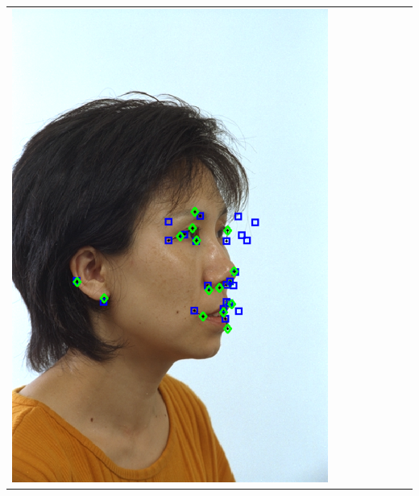 \documentclass[landscape,final,a0paper,fontscale=0.27065]{baposter}
\begin{document}
\begin{poster}
{{\begin{tabular}{@{}rccccccc@{}}
 \parbox[c]{0.11\linewidth}{\includegraphics[width=\linewidth]{images/l_hr_success_1.pdf}} &

\end{tabular}}}
\end{poster}
\end{document}
